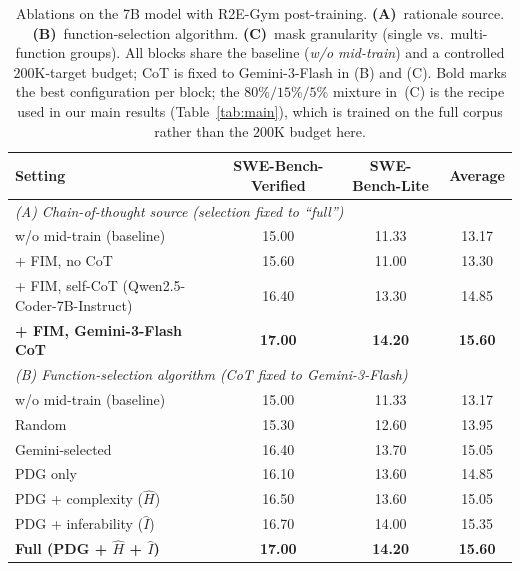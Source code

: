\begin{table}[t]
\centering
\caption{Ablations on the 7B model with R2E-Gym post-training.
\textbf{(A)}~rationale source. \textbf{(B)}~function-selection algorithm.
\textbf{(C)}~mask granularity (single vs.\ multi-function groups).
All blocks share the baseline (\emph{w/o mid-train}) and a controlled
$200$K-target budget; CoT is fixed to Gemini-3-Flash in (B) and (C).
Bold marks the best configuration per block; the $80\%/15\%/5\%$ mixture
in~(C) is the recipe used in our main results (Table~\ref{tab:main}),
which is trained on the full corpus rather than the $200$K budget here.}
\label{tab:ablation}
\small
\setlength{\tabcolsep}{8pt}
\begin{tabular}{lccc}
\toprule
Setting & SWE-Bench-Verified & SWE-Bench-Lite & Average \\
\midrule
\multicolumn{4}{l}{\emph{(A) Chain-of-thought source (selection fixed to ``full'')}} \\
\midrule
w/o mid-train (baseline)                  & 15.00 & 11.33 & 13.17 \\
+ FIM, no CoT                             & 15.60 & 11.00 & 13.30 \\
+ FIM, self-CoT (Qwen2.5-Coder-7B-Instruct) & 16.40 & 13.30 & 14.85 \\
\textbf{+ FIM, Gemini-3-Flash CoT}        & \textbf{17.00} & \textbf{14.20} & \textbf{15.60} \\
\midrule
\multicolumn{4}{l}{\emph{(B) Function-selection algorithm (CoT fixed to Gemini-3-Flash)}} \\
\midrule
w/o mid-train (baseline)                    & 15.00 & 11.33 & 13.17 \\
Random                                      & 15.30 & 12.60 & 13.95 \\
Gemini-selected                             & 16.40 & 13.70 & 15.05 \\
PDG only                                    & 16.10 & 13.60 & 14.85 \\
PDG + complexity ($\hat{H}$)                & 16.50 & 13.60 & 15.05 \\
PDG + inferability ($\hat{I}$)              & 16.70 & 14.00 & 15.35 \\
\textbf{Full (PDG + $\hat{H}$ + $\hat{I}$)} & \textbf{17.00} & \textbf{14.20} & \textbf{15.60} \\

\end{tabular}
\end{table}
